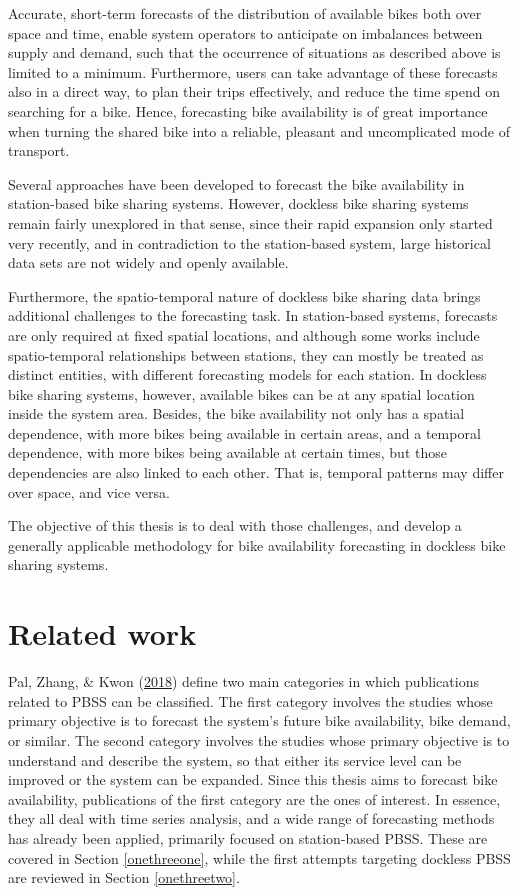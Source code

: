 \documentclass[12pt,oneside]{reedthesis}
\begin{document}
Accurate, short-term forecasts of the distribution of available bikes
both over space and time, enable system operators to anticipate on
imbalances between supply and demand, such that the occurrence of
situations as described above is limited to a minimum. Furthermore,
users can take advantage of these forecasts also in a direct way, to
plan their trips effectively, and reduce the time spend on searching for
a bike. Hence, forecasting bike availability is of great importance when
turning the shared bike into a reliable, pleasant and uncomplicated mode
of transport.

Several approaches have been developed to forecast the bike availability
in station-based bike sharing systems. However, dockless bike sharing
systems remain fairly unexplored in that sense, since their rapid
expansion only started very recently, and in contradiction to the
station-based system, large historical data sets are not widely and
openly available.

Furthermore, the spatio-temporal nature of dockless bike sharing data
brings additional challenges to the forecasting task. In station-based
systems, forecasts are only required at fixed spatial locations, and
although some works include spatio-temporal relationships between
stations, they can mostly be treated as distinct entities, with
different forecasting models for each station. In dockless bike sharing
systems, however, available bikes can be at any spatial location inside
the system area. Besides, the bike availability not only has a spatial
dependence, with more bikes being available in certain areas, and a
temporal dependence, with more bikes being available at certain times,
but those dependencies are also linked to each other. That is, temporal
patterns may differ over space, and vice versa.

The objective of this thesis is to deal with those challenges, and
develop a generally applicable methodology for bike availability
forecasting in dockless bike sharing systems.

\section{Related work}\label{onethree}

Pal, Zhang, \& Kwon (\protect\hyperlink{ref-pal2018}{2018}) define two
main categories in which publications related to PBSS can be classified.
The first category involves the studies whose primary objective is to
forecast the system's future bike availability, bike demand, or similar.
The second category involves the studies whose primary objective is to
understand and describe the system, so that either its service level can
be improved or the system can be expanded. Since this thesis aims to
forecast bike availability, publications of the first category are the
ones of interest. In essence, they all deal with time series analysis,
and a wide range of forecasting methods has already been applied,
primarily focused on station-based PBSS. These are covered in Section
\ref{onethreeone}, while the first attempts targeting dockless PBSS are
reviewed in Section \ref{onethreetwo}.
\end{document}
